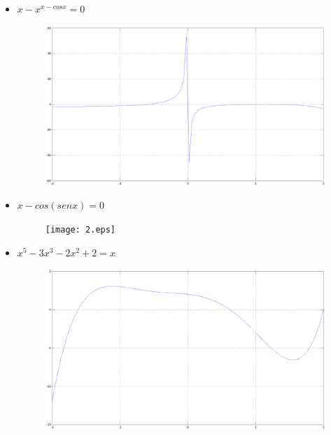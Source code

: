 \documentclass[a4paper,12pt]{article}
\begin{document}
    \begin{itemize}
     \item $x-x^{x-cosx} = 0$
     
     \begin{figure}[h]
      \centering
      \includegraphics[scale = 0.3]{1.eps}
     \end{figure}

     
     \item $x-cos(senx) = 0$
     
     \begin{figure}[h]
      \centering
      \texttt{[image: 2.eps]}
     \end{figure}
     
     \newpage
     
     \item $x^5 - 3x^3 - 2x^2 + 2 = x$
     
     \begin{figure}[h]
      \centering
      \includegraphics[scale = 0.3]{3.eps}
     \end{figure}
    \end{itemize}
\end{document}
